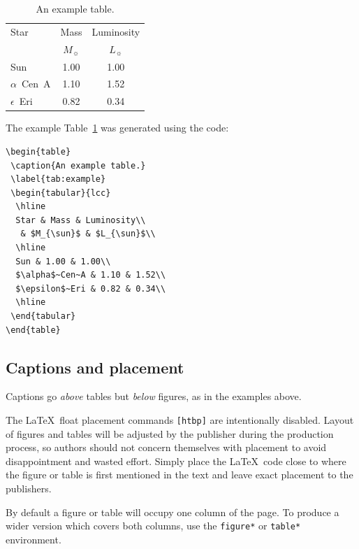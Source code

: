 \documentclass[fleqn,usenatbib,useAMS]{rasti}
\begin{document}
\begin{table}
 \caption{An example table.}
 \label{tab:example}
 \begin{tabular}{lcc}
  \hline
  Star & Mass & Luminosity\\
   & $M_{\sun}$ & $L_{\sun}$\\
  \hline
  Sun & 1.00 & 1.00\\
  $\alpha$~Cen~A & 1.10 & 1.52\\
  $\epsilon$~Eri & 0.82 & 0.34\\
  \hline
 \end{tabular}
\end{table}
The example Table~\ref{tab:example} was generated using the code:
\begin{verbatim}
\begin{table}
 \caption{An example table.}
 \label{tab:example}
 \begin{tabular}{lcc}
  \hline
  Star & Mass & Luminosity\\
   & $M_{\sun}$ & $L_{\sun}$\\
  \hline
  Sun & 1.00 & 1.00\\
  $\alpha$~Cen~A & 1.10 & 1.52\\
  $\epsilon$~Eri & 0.82 & 0.34\\
  \hline
 \end{tabular}
\end{table}
\end{verbatim}

\subsection{Captions and placement}
Captions go \emph{above} tables but \emph{below} figures, as in the examples above.

The \LaTeX\ float placement commands \verb'[htbp]' are intentionally disabled.
Layout of figures and tables will be adjusted by the publisher during the production process, so authors should not concern themselves with placement to avoid disappointment and wasted effort.
Simply place the \LaTeX\ code close to where the figure or table is first mentioned in the text and leave exact placement to the publishers.

By default a figure or table will occupy one column of the page.
To produce a wider version which covers both columns, use the \verb'figure*' or \verb'table*'  environment.
\end{document}
